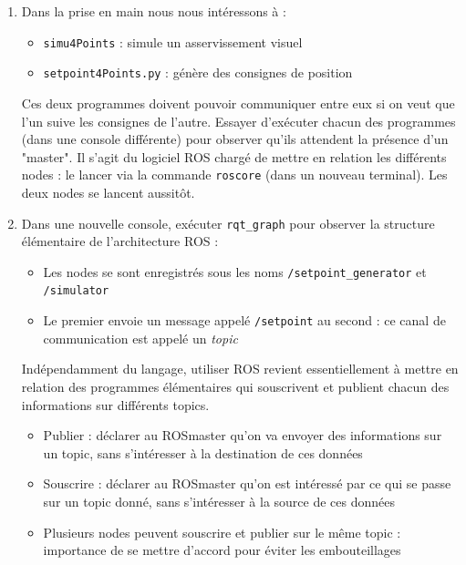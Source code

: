 \documentclass[12pt,a4paper]{article}
\begin{document}
\begin{enumerate}
On voit qu'en plus de \texttt{simu4Points}, ROS nous propose d'exécuter \texttt{arm\_bridge.py}, \\\texttt{configure.py}  et \texttt{setpoint4Points.py}. Il s'agit de fichiers Python qui n'ont pas besoin d'être compilés pour être lancés\footnote{ Pour être détecté par \texttt{rosrun} un fichier Python doit être exécutable}.
On reconnaît le fichier \texttt{configure.py} qui a été lancé au début pour initialiser l'environnement.
\item Dans la prise en main nous nous intéressons à :
\begin{itemize}
\item  \texttt{simu4Points} : simule un asservissement visuel
\item \texttt{setpoint4Points.py} : génère des consignes de position
\end{itemize}
 Ces deux programmes doivent pouvoir communiquer entre eux si on veut que l'un suive les consignes de l'autre.
Essayer d'exécuter chacun des programmes (dans une console différente) pour observer qu'ils attendent la présence d'un "master".
Il s'agit du logiciel ROS chargé de mettre en relation les différents nodes : le lancer via la commande \texttt{roscore} (dans un nouveau terminal).
Les deux nodes se lancent aussitôt.
\item Dans une nouvelle console, exécuter \texttt{rqt\_graph}  pour observer la structure élémentaire de l'architecture ROS :
\begin{itemize}
\item Les nodes se sont enregistrés sous les noms \texttt{/setpoint\_generator} et \texttt{/simulator} 
\item Le premier envoie un message appelé \texttt{/setpoint} au second : ce canal de communication est appelé un \emph{topic}
\end{itemize}
Indépendamment du langage, utiliser ROS revient essentiellement à mettre en relation des programmes élémentaires qui souscrivent et publient chacun des informations sur différents topics.
\begin{itemize}
\item Publier : déclarer au ROSmaster qu'on va envoyer des informations sur un topic, sans s'intéresser à la destination de ces données
\item Souscrire : déclarer au ROSmaster qu'on est intéressé par ce qui se passe sur un topic donné, sans s'intéresser à la source de ces données
\item Plusieurs nodes peuvent souscrire et publier sur le même topic : importance de se mettre d'accord pour éviter les embouteillages

\end{itemize}
\end{enumerate}
\end{document}
